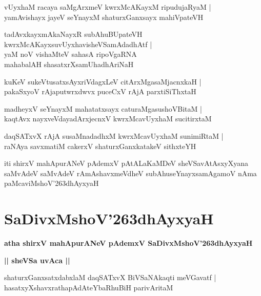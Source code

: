 \documentclass[twoside,12pt,openright]{book}
\def\S{\char'263}
\newcounter{shloka}[chapter]
\def\uvaca#1{\centerline{{\large\textbf{#1}}}}
\begin{document}
\begin{shloka}%
vUyxhaM racaya saMgArxmeV kwrxMcAKayxM ripudujaRyaM |\\
yamAvishayx jayeV seYnayxM shaturxGanxsayx mahiVpateVH
\end{shloka}

\begin{shloka}%
tadAvxkayxmAkaNayxR subAhuBUpateVH \\
kwrxMcAKayxsuvUyxhavisheVSamAdadhAtf |\\
yaM noV vishaMteV sahasA ripoVgaRNA \\
mahabalAH shasatxrXsamUhadhAriNaH 
\end{shloka}

\begin{shloka}%
kuKeV sukeVtusatxsAyxriVdagxLeV citArxMgasaMjacnxkaH |\\
pakaSxyoV rAjaputwrxdwvx puceCxV rAjA parxtiSiThxtaH 
\end{shloka}

\begin{shloka}%
madheyxV seYnayxM mahatatxsayx caturaMgasushoVBitaM |\\
kaqtAvx nayxveVdayadArxjecnxV kwrxMcavUyxhaM sucitirxtaM 
\end{shloka}

\begin{shloka}%
daqSATxvX rAjA susaMnadadhxM kwrxMcavUyxhaM sunimiRtaM |\\
raNAya savxmatiM cakerxV shaturxGanxkatakeV sithxteYH
\end{shloka}

\begin{center}
iti shirxV mahApurANeV pAdemxV pAtALaKaMDeV sheVSavAtAsxyXyana saMvAdeV 
saMvAdeV rAmAshavxmeVdheV subAhuseYnayxsamAgamoV nAma paMcaviMshoV\S dhAyxyaH
\end{center}

\chapter{SaDivxMshoV\S dhAyxyaH}

\begin{center}
{\LARGE\bfseries atha shirxV mahApurANeV pAdemxV  SaDivxMshoV\S dhAyxyaH}
\end{center}


\uvaca{|| sheVSa uvAca ||}

\begin{shloka}%
shaturxGanxsatxdabxlaM daqSATxvX BiVSaNAkaqti meVGavatf |\\
hasatxyXshavxrathapAdAteYbaRhuBiH parivAritaM 
\end{shloka}
\end{document}

